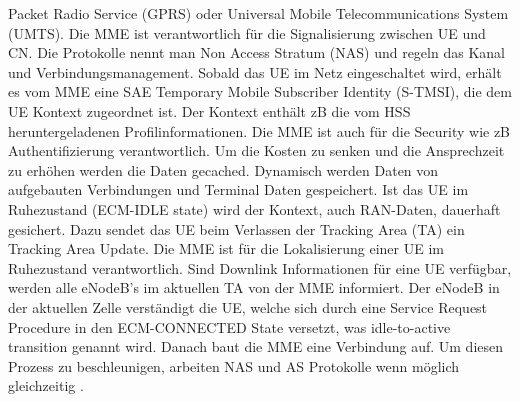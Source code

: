 Packet Radio Service (GPRS) oder Universal Mobile Telecommunications System (UMTS). Die MME ist verantwortlich für die Signalisierung zwischen UE und CN. Die Protokolle nennt man Non Access Stratum (NAS) und regeln das Kanal und Verbindungsmanagement. Sobald das UE im Netz eingeschaltet wird, erhält es vom MME eine SAE Temporary Mobile Subscriber Identity (S-TMSI), die dem UE Kontext zugeordnet ist. Der Kontext enthält zB die vom HSS heruntergeladenen Profilinformationen. Die MME ist auch für die Security wie zB Authentifizierung verantwortlich. Um die Kosten zu senken und die Ansprechzeit zu erhöhen werden die Daten gecached. Dynamisch werden Daten von aufgebauten Verbindungen und Terminal Daten gespeichert. Ist das UE im Ruhezustand (ECM-IDLE state) wird der Kontext, auch RAN-Daten, dauerhaft gesichert. Dazu sendet das UE beim Verlassen der Tracking Area (TA) ein Tracking Area Update. Die MME ist für die Lokalisierung einer UE im Ruhezustand verantwortlich. Sind Downlink Informationen für eine UE verfügbar, werden alle eNodeB's im aktuellen TA von der MME informiert. Der eNodeB in der aktuellen Zelle verständigt die UE, welche sich durch eine Service Request Procedure in den ECM-CONNECTED State versetzt, was idle-to-active transition genannt wird. Danach baut die MME eine Verbindung auf. Um diesen Prozess zu beschleunigen, arbeiten NAS und AS Protokolle wenn möglich gleichzeitig \cite{Ses11}.


